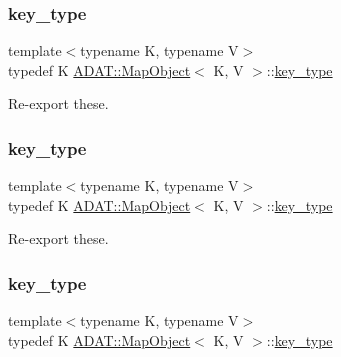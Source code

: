 \mbox{\label{classADAT_1_1MapObject_a98d458cd1ecd1265ae5451619de933db}} 
\subsubsection{\texorpdfstring{key\_type}{key\_type}\hspace{0.1cm}{\footnotesize\ttfamily [1/3]}}
{\footnotesize\ttfamily template$<$typename K, typename V$>$ \\
typedef K \mbox{\hyperlink{classADAT_1_1MapObject}{A\+D\+A\+T\+::\+Map\+Object}}$<$ K, V $>$\+::\mbox{\hyperlink{classADAT_1_1MapObject_a98d458cd1ecd1265ae5451619de933db}{key\+\_\+type}}}



Re-\/export these. 

\mbox{\label{classADAT_1_1MapObject_a98d458cd1ecd1265ae5451619de933db}} 
\subsubsection{\texorpdfstring{key\_type}{key\_type}\hspace{0.1cm}{\footnotesize\ttfamily [2/3]}}
{\footnotesize\ttfamily template$<$typename K, typename V$>$ \\
typedef K \mbox{\hyperlink{classADAT_1_1MapObject}{A\+D\+A\+T\+::\+Map\+Object}}$<$ K, V $>$\+::\mbox{\hyperlink{classADAT_1_1MapObject_a98d458cd1ecd1265ae5451619de933db}{key\+\_\+type}}}



Re-\/export these. 

\mbox{\label{classADAT_1_1MapObject_a98d458cd1ecd1265ae5451619de933db}} 
\subsubsection{\texorpdfstring{key\_type}{key\_type}\hspace{0.1cm}{\footnotesize\ttfamily [3/3]}}
{\footnotesize\ttfamily template$<$typename K, typename V$>$ \\
typedef K \mbox{\hyperlink{classADAT_1_1MapObject}{A\+D\+A\+T\+::\+Map\+Object}}$<$ K, V $>$\+::\mbox{\hyperlink{classADAT_1_1MapObject_a98d458cd1ecd1265ae5451619de933db}{key\+\_\+type}}}



